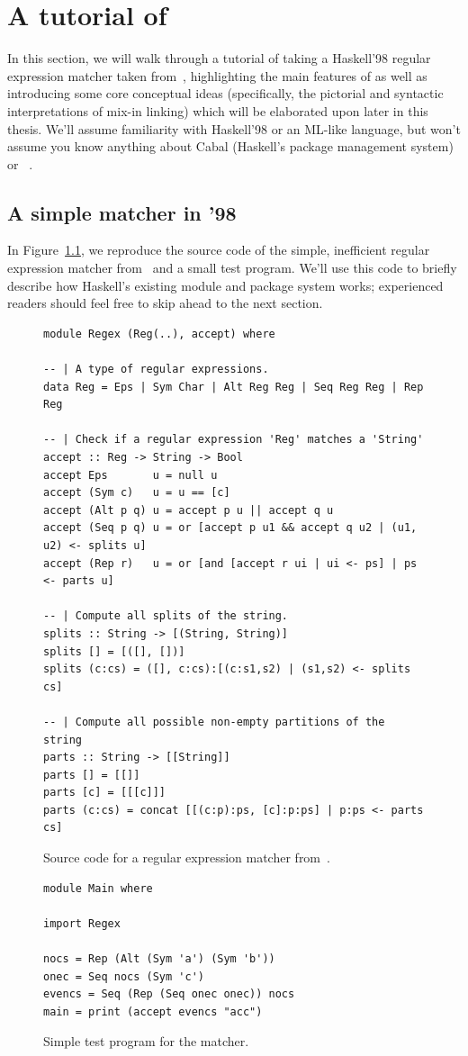 \chapter{A tutorial of \Backpack{}}
\label{sec:tour}

In this section, we will walk through a tutorial of taking a Haskell'98
regular expression matcher taken
from~\cite{Fischer:2010:PRE:1863543.1863594}, highlighting the main
features of \Backpack{} as well as introducing some core conceptual
ideas (specifically, the pictorial and syntactic interpretations
of mix-in linking) which will be elaborated upon later in this thesis.  We'll assume
familiarity with Haskell'98 or an ML-like language, but won't assume you
know anything about Cabal (Haskell's package management system) or
\OldBackpack{}~\cite{backpack}.

\section{A simple matcher in '98}

In Figure~\ref{fig:matcher-haskell98}, we reproduce the source code of
the simple, inefficient regular expression matcher
from~\cite{Fischer:2010:PRE:1863543.1863594} and a small test program.
We'll use this code to briefly describe how Haskell's existing module
and package system works; experienced readers should feel free to skip
ahead to the next section.

\begin{figure}
\begin{lstlisting}
module Regex (Reg(..), accept) where

-- | A type of regular expressions.
data Reg = Eps | Sym Char | Alt Reg Reg | Seq Reg Reg | Rep Reg

-- | Check if a regular expression 'Reg' matches a 'String'
accept :: Reg -> String -> Bool
accept Eps       u = null u
accept (Sym c)   u = u == [c]
accept (Alt p q) u = accept p u || accept q u
accept (Seq p q) u = or [accept p u1 && accept q u2 | (u1, u2) <- splits u]
accept (Rep r)   u = or [and [accept r ui | ui <- ps] | ps <- parts u]

-- | Compute all splits of the string.
splits :: String -> [(String, String)]
splits [] = [([], [])]
splits (c:cs) = ([], c:cs):[(c:s1,s2) | (s1,s2) <- splits cs]

-- | Compute all possible non-empty partitions of the string
parts :: String -> [[String]]
parts [] = [[]]
parts [c] = [[[c]]]
parts (c:cs) = concat [[(c:p):ps, [c]:p:ps] | p:ps <- parts cs]
\end{lstlisting}
\caption{Source code for a regular expression matcher from~\cite{Fischer:2010:PRE:1863543.1863594}.}
\begin{lstlisting}
module Main where

import Regex

nocs = Rep (Alt (Sym 'a') (Sym 'b'))
onec = Seq nocs (Sym 'c')
evencs = Seq (Rep (Seq onec onec)) nocs
main = print (accept evencs "acc")
\end{lstlisting}
\caption{Simple test program for the matcher.}
\label{fig:matcher-haskell98}
\end{figure}

